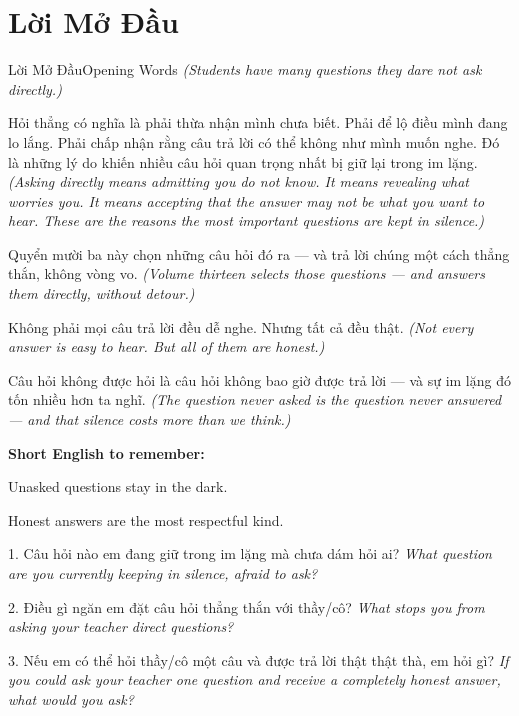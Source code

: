 \chapter*{Lời Mở Đầu}

\begin{truyen}{Lời Mở Đầu}{Opening Words}
\textit{(Students have many questions they dare not ask directly.)}

Hỏi thẳng có nghĩa là phải thừa nhận mình chưa biết. Phải để lộ điều mình đang lo lắng. Phải chấp nhận rằng câu trả lời có thể không như mình muốn nghe. Đó là những lý do khiến nhiều câu hỏi quan trọng nhất bị giữ lại trong im lặng.
\textit{(Asking directly means admitting you do not know. It means revealing what worries you. It means accepting that the answer may not be what you want to hear. These are the reasons the most important questions are kept in silence.)}

Quyển mười ba này chọn những câu hỏi đó ra — và trả lời chúng một cách thẳng thắn, không vòng vo.
\textit{(Volume thirteen selects those questions --- and answers them directly, without detour.)}

Không phải mọi câu trả lời đều dễ nghe. Nhưng tất cả đều thật.
\textit{(Not every answer is easy to hear. But all of them are honest.)}
\end{truyen}

\begin{baihoc}
Câu hỏi không được hỏi là câu hỏi không bao giờ được trả lời --- và sự im lặng đó tốn nhiều hơn ta nghĩ.
\textit{(The question never asked is the question never answered --- and that silence costs more than we think.)}
\end{baihoc}

\begin{ghinhoanh}
\textbf{Short English to remember:}

Unasked questions stay in the dark.

Honest answers are the most respectful kind.
\end{ghinhoanh}

\begin{tuhocnhanh}
1. Câu hỏi nào em đang giữ trong im lặng mà chưa dám hỏi ai? \textit{What question are you currently keeping in silence, afraid to ask?}

2. Điều gì ngăn em đặt câu hỏi thẳng thắn với thầy/cô? \textit{What stops you from asking your teacher direct questions?}

3. Nếu em có thể hỏi thầy/cô một câu và được trả lời thật thật thà, em hỏi gì? \textit{If you could ask your teacher one question and receive a completely honest answer, what would you ask?}
\end{tuhocnhanh}

\ngancach
